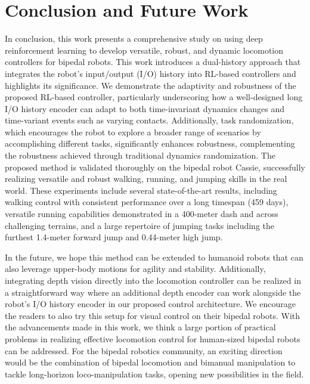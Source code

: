\section{Conclusion and Future Work}\label{sec:conclusion}
In conclusion, this work presents a comprehensive study on using deep reinforcement learning to develop versatile, robust, and dynamic locomotion controllers for bipedal robots. 
This work introduces a dual-history approach that integrates the robot's input/output (I/O) history into RL-based controllers and highlights its significance. 
We demonstrate the adaptivity and robustness of the proposed RL-based controller, particularly underscoring how a well-designed long I/O history encoder can adapt to both time-invariant dynamics changes and time-variant events such as varying contacts. 
Additionally, task randomization, which encourages the robot to explore a broader range of scenarios by accomplishing different tasks, significantly enhances robustness, complementing the robustness achieved through traditional dynamics randomization.
The proposed method is validated thoroughly on the bipedal robot Cassie, successfully realizing versatile and robust walking, running, and jumping skills in the real world. 
These experiments include several state-of-the-art results, including walking control with consistent performance over a long timespan (459 days), versatile running capabilities demonstrated in a 400-meter dash and across challenging terrains, and a large repertoire of jumping tasks including the furthest 1.4-meter forward jump and 0.44-meter high jump.


In the future, we hope this method can be extended to humanoid robots that can also leverage upper-body motions for agility and stability. 
Additionally, integrating depth vision directly into the locomotion controller can be realized in a straightforward way where an additional depth encoder can work alongside the robot's I/O history encoder in our proposed control architecture.  
We encourage the readers to also try this setup for visual control on their bipedal robots. 
With the advancements made in this work, we think a large portion of practical problems in realizing effective locomotion control for human-sized bipedal robots can be addressed. 
For the bipedal robotics community, an exciting direction would be the combination of bipedal locomotion and bimanual manipulation to tackle long-horizon loco-manipulation tasks, opening new possibilities in the field.